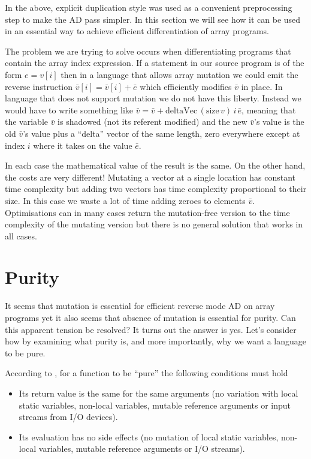 \documentclass[12pt]{article}
\begin{document}
In the above, explicit duplication style was used as a convenient
preprocessing step to make the AD pass simpler.  In this section we
will see how it can be used in an essential way to achieve efficient
differentiation of array programs.

The problem we are trying to solve occurs when differentiating
programs that contain the array index expression.  If a statement in
our source program is of the form $e = v[i]$ then in a language that
allows array mutation we could emit the reverse instruction
$\bar{v}[i] = \bar{v}[i] + \bar{e}$ which efficiently modifies
$\bar{v}$ in place.  In language that does not support mutation we do
not have this liberty.  Instead we would have to write something like
$\bar{v} = \bar{v} + \textrm{deltaVec} \, (\textrm{size} \, v) \, i \,
\bar{e}$, meaning that the variable $\bar{v}$ is shadowed (not its
referent modified) and the new $\bar{v}$'s value is the old
$\bar{v}$'s value plus a ``delta'' vector of the same length, zero
everywhere except at index $i$ where it takes on the value $\bar{e}$.

In each case the mathematical value of the result is the same.  On the
other hand, the costs are very different!  Mutating a vector at a
single location has constant time complexity but adding two vectors
has time complexity proportional to their size.  In this case we waste
a lot of time adding zeroes to elements $\bar{v}$.  Optimisations can
in many cases return the mutation-free version to the time complexity
of the mutating version but there is no general solution that works in
all cases.

\section{Purity}

It seems that mutation is essential for efficient reverse mode AD on
array programs yet it also seems that absence of mutation is essential
for purity.  Can this apparent tension be resolved?  It turns out the
answer is yes.  Let's consider how by examining what purity is, and
more importantly, why we want a language to be pure.

According to \cite{purity}, for a function to be ``pure'' the
following conditions must hold

\begin{itemize}
  \item
    Its return value is the same for the same arguments (no variation
    with local static variables, non-local variables, mutable
    reference arguments or input streams from I/O devices).

  \item
    Its evaluation has no side effects (no mutation of local
    static variables, non-local variables, mutable reference
    arguments or I/O streams).
\end{itemize}
\end{document}
